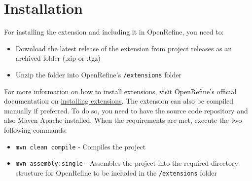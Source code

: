 \chapter{Installation}
For installing the extension and including it in OpenRefine, you need to:
\begin{itemize}
    \item Download the latest release of the extension from project releases as an archived folder (.zip or .tgz)
    \item Unzip the folder into OpenRefine's \texttt{/extensions} folder
\end{itemize}
For more information on how to install extensions, visit OpenRefine's official documentation on
\href{https://docs.openrefine.org/manual/installing#installing-extensions}{installing extensions}.
The extension can also be compiled manually if preferred.
To do so, you need to have the source code repository and also Maven Apache installed.
When the requirements are met, execute the two following commands:
\begin{itemize}
    \item \texttt{mvn clean compile} - Compiles the project
    \item \texttt{mvn assembly:single} - Assembles the project into the required directory structure for
     OpenRefine to be included in the \texttt{/extensions} folder
\end{itemize}